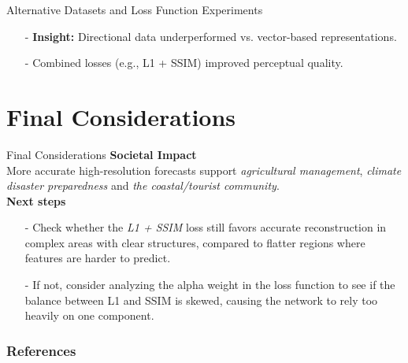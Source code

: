 \documentclass[footline=authortitle]{beamer}
\begin{document}
\begin{frame}{Alternative Datasets and Loss Function Experiments}
  \begin{table}
  \centering
  \end{table}

  \vspace{0.2cm}
  \begin{itemize}
  \justifying
      \item[-] \textbf{Insight:} Directional data underperformed vs. vector-based representations.
      \item[-] Combined losses (e.g., L1 + SSIM) improved perceptual quality.
  \end{itemize}
\end{frame}

\section{Final Considerations}
\begin{frame}{Final Considerations}
\justifying
    \textbf{Societal Impact}
    \\More accurate high-resolution forecasts support \textit{agricultural management}, \textit{climate disaster preparedness} and \textit{the coastal/tourist community}.\\\vspace{0.5cm}
    \textbf{Next steps}
    \begin{itemize}
    \justifying
        \item[-] Check whether the \textit{L1 + SSIM} loss still favors accurate reconstruction in complex areas with clear structures, compared to flatter regions where features are harder to predict.
        \item[-] If not, consider analyzing the alpha weight in the loss function to see if the balance between L1 and SSIM is skewed, causing the network to rely too heavily on one component.
    \end{itemize}
\end{frame}

\begin{frame}
    \frametitle{References}
    \printbibliography
\end{frame}
\end{document}
